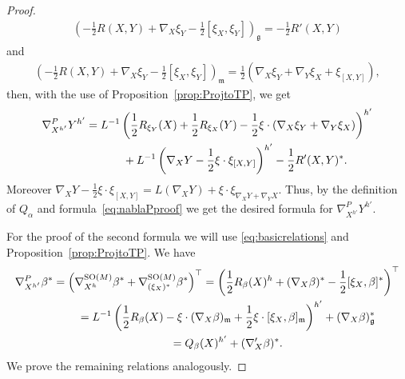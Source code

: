 \documentclass[pdftex]{sigma}
\numberwithin{equation}{section}
\begin{document}
\begin{proof}
\begin{gather*}
\left(-\frac{1}{2}R(X,Y)+\nabla_X\xi_Y-\frac{1}{2}[\xi_X,\xi_Y]\right)_{\mathfrak{g}}=-\frac{1}{2}R'(X,Y)
\end{gather*}
and
\begin{gather*}
\left(-\frac{1}{2}R(X,Y)+\nabla_X\xi_Y-\frac{1}{2}[\xi_X,\xi_Y]\right)_{\mathfrak{m}}=\frac{1}{2}\left( \nabla_X\xi_Y+\nabla_Y\xi_X+\xi_{[X,Y]} \right),
\end{gather*}
then, with the use of Proposition~\ref{prop:ProjtoTP}, we get
\begin{gather*}
\nabla^P_{X^{h'}}Y^{h'}=L^{-1}\left(\frac{1}{2}R_{\xi_Y}(X)+\frac{1}{2}R_{\xi_X}(Y)-\frac{1}{2}\xi\cdot(\nabla_X\xi_Y+\nabla_Y\xi_X)\right)^{h'}\\
\hphantom{\nabla^P_{X^{h'}}Y^{h'}=}{}
+L^{-1}\left(\nabla_XY-\frac{1}{2}\xi\cdot\xi_{[X,Y]}\right)^{h'}-\frac{1}{2}R'(X,Y)^{\ast}.
\end{gather*}
Moreover $\nabla_XY-\frac{1}{2}\xi\cdot\xi_{[X,Y]}=L(\nabla_XY)+\xi\cdot\xi_{\nabla_XY+\nabla_YX}$. Thus, by the def\/inition of $Q_{\alpha}$ and formula~\eqref{eq:nablaPproof} we get the desired formula for $\nabla^P_{X^{h'}}Y^{h'}$.

For the proof of the second formula we will use \eqref{eq:basicrelations} and Proposition~\ref{prop:ProjtoTP}. We have
\begin{gather*}
\nabla^P_{X^{h'}}\beta^{\ast} =\left( \nabla^{{\rm SO}(M)}_{X^h}\beta^{\ast}
+\nabla^{{\rm SO}(M)}_{(\xi_X)^{\ast}}\beta^{\ast} \right)^{\top} =\left(\frac{1}{2}R_{\beta}(X)^h+(\nabla_X\beta)^{\ast}-\frac{1}{2}[\xi_X,\beta]^{\ast}\right)^{\top}\\
\hphantom{\nabla^P_{X^{h'}}\beta^{\ast}}{}
=L^{-1}\left(\frac{1}{2}R_{\beta}(X)-\xi\cdot(\nabla_X\beta)_{\mathfrak{m}}+\frac{1}{2}\xi\cdot[\xi_X,\beta]_{\mathfrak{m}}\right)^{h'}
+(\nabla_X\beta)^{\ast}_{\mathfrak{g}}\\
\hphantom{\nabla^P_{X^{h'}}\beta^{\ast}}{}
=Q_{\beta}(X)^{h'}+(\nabla'_X\beta)^{\ast}.
\end{gather*}
We prove the remaining relations analogously.
\end{proof}
\end{document}
